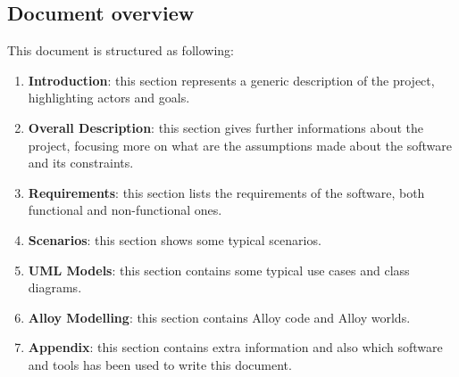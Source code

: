 \subsection{Document overview}
This document is structured as following:
\begin{enumerate}
	\item \textbf{Introduction}: this section represents a generic description of the project, highlighting actors and goals.
	\item \textbf{Overall Description}: this section gives further informations about the project, focusing more on what are the assumptions made about the software and its constraints.
	\item \textbf{Requirements}: this section lists the requirements of the software, both functional and non-functional ones.
	\item \textbf{Scenarios}: this section shows some typical scenarios.
	\item \textbf{UML Models}: this section contains some typical use cases and class diagrams.
	\item \textbf{Alloy Modelling}: this section contains Alloy code and Alloy worlds.
	\item \textbf{Appendix}: this section contains extra information and also which software and tools has been used to write this document.
\end{enumerate}